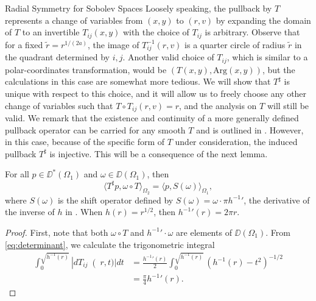 \begin{chapter}{Radial Symmetry for Sobolev Spaces}
Loosely speaking, the pullback by $T$ represents a change of variables from $(x,y)$ to $(r,v)$ by expanding the domain of $T$ to an invertible $T_{ij}(x,y)$ with the choice of $T_{ij}$ is arbitrary.  
Observe that for a fixed $\tilde r = r^{1/(2a)}$, the image of $T_{ij}^{-1}(r,v)$ is a quarter circle of radius $\tilde r$ in the quadrant determined by $i,j$.
Another valid choice of $T_{ij}$, which is similar to a polar-coordinates transformation, would be $(T(x,y), \mathrm{Arg}(x,y))$, but the calculations in this case are somewhat more tedious.
We will show that $T^\sharp$ is unique with respect to this choice, and it will allow us to freely choose any other change of variables such that $T \circ T_{ij}(r,v) = r$, and the analysis on $T$ will still be valid.
We remark that the existence and continuity of a more generally defined pullback operator can be carried for any smooth $T$ and is outlined in \citep{hormander1983}.
However, in this case, because of the specific form of $T$ under consideration, the induced pullback $T^\sharp$ is injective. 
This will be a consequence of the next lemma.
\begin{lem} \label{lem:innerProduct}
  For all $p\in\DD^*(\Omega_1)$ and $\omega \in \DD(\Omega_1)$, then 
  \begin{equation}
    \langle T^\sharp p , \omega \circ T \rangle_{\Omega_2} = \langle p,S(\omega)\rangle_{\Omega_1},
  \end{equation}
  where $S(\omega)$ is the shift operator defined by $S(\omega) = \omega\cdot\pi {h^{-1}}'$, the derivative of the inverse of $h$ in . 
  When $h(r) = r^{1/2}$, then ${h^{-1}}'(r) = 2\pi r$.
\end{lem}
\begin{proof}
  First, note that both $\omega \circ T$ and ${h^{-1}}'\cdot \omega$ are elements of $\DD(\Omega_1)$.  
  From \eqref{eq:determinant}, we calculate the trigonometric integral
  \begin{align}
    \int_0^{\sqrt{h^{-1}(r)}} \left|dT_{ij}\right(r,t)| dt 
    &= \frac{{h^{-1}}'(r)}2 \int_0^{\sqrt{h^{-1}(r)}}\left(h^{-1}(r) - t^2\right)^{-1/2}\nonumber\\
    &= \frac\pi4 {h^{-1}}'(r).

\end{align}
\end{proof}
\end{chapter}
